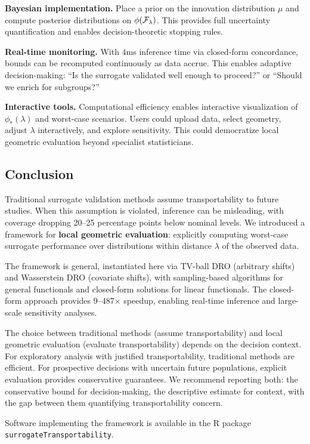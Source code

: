 \documentclass{article}
\begin{document}
\textbf{Bayesian implementation.} Place a prior on the innovation distribution $\mu$ and compute posterior distributions on $\phi(\mathcal{F}_\lambda)$. This provides full uncertainty quantification and enables decision-theoretic stopping rules.

\textbf{Real-time monitoring.} With 4ms inference time via closed-form concordance, bounds can be recomputed continuously as data accrue. This enables adaptive decision-making: ``Is the surrogate validated well enough to proceed?'' or ``Should we enrich for subgroups?''

\textbf{Interactive tools.} Computational efficiency enables interactive visualization of $\phi_*(\lambda)$ and worst-case scenarios. Users could upload data, select geometry, adjust $\lambda$ interactively, and explore sensitivity. This could democratize local geometric evaluation beyond specialist statisticians.

\subsection{Conclusion}

Traditional surrogate validation methods assume transportability to future studies. When this assumption is violated, inference can be misleading, with coverage dropping 20--25 percentage points below nominal levels. We introduced a framework for \textbf{local geometric evaluation}: explicitly computing worst-case surrogate performance over distributions within distance $\lambda$ of the observed data.

The framework is general, instantiated here via TV-ball DRO (arbitrary shifts) and Wasserstein DRO (covariate shifts), with sampling-based algorithms for general functionals and closed-form solutions for linear functionals. The closed-form approach provides 9--487$\times$ speedup, enabling real-time inference and large-scale sensitivity analyses.

The choice between traditional methods (assume transportability) and local geometric evaluation (evaluate transportability) depends on the decision context. For exploratory analysis with justified transportability, traditional methods are efficient. For prospective decisions with uncertain future populations, explicit evaluation provides conservative guarantees. We recommend reporting both: the conservative bound for decision-making, the descriptive estimate for context, with the gap between them quantifying transportability concern.

Software implementing the framework is available in the R package \texttt{surrogateTransportability}.
\end{document}
